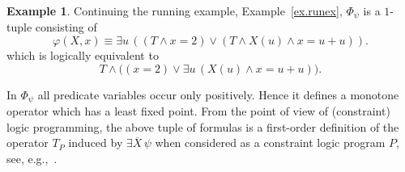 \documentclass[acmsmall]{acmart}
\theoremstyle{plain}
\theoremstyle{definition}
\newtheorem{example}[theorem]{Example}
\renewcommand{\phi}{\varphi}
\newcommand{\mybar}[1]{\overline{#1}}
\begin{document}
\begin{example}\label{ex.runningPhi}
Continuing the running example, Example~\ref{ex.runex}, $\Phi_\psi$ is a $1$-tuple consisting of
\[
\phi(X,x) \equiv \exists u\, (( T \land x=2) \lor (T\land X(u) \land x = u+u)).
\]
which is logically equivalent to
\[
T \land \big( (x=2) \lor \exists u\, ( X(u) \land x = u+u) ).
\]
\end{example}

In $\Phi_\psi$ all predicate variables occur only positively.
Hence it defines a monotone operator which has a least fixed point.
From the point of view of (constraint) logic programming, the above
 tuple of formulas is a first-order definition
of the operator $T_P$ induced by $\exists \mybar{X}\, \psi$ when considered as a constraint logic program $P$, see, e.g.,~\cite{Jaffar94Constraint}.
\end{document}
